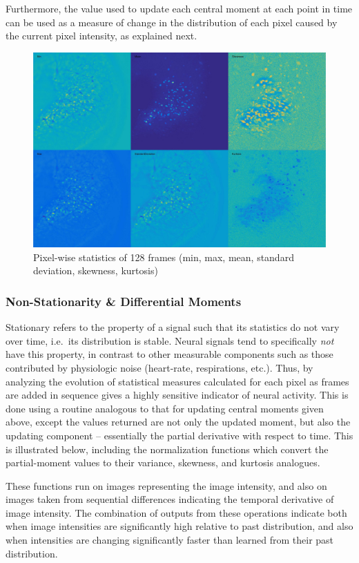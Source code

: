 Furthermore, the value used to update each central moment at each point in time can be used as a measure of change in the distribution of each pixel caused by the current pixel intensity, as explained next.

\begin{figure}[htb]\centering
	\includegraphics[width=12cm]{figures/statistics_of_128_frames_contrast_enhanced.jpg}
	\caption{Pixel-wise statistics of 128 frames (min, max, mean, standard deviation, skewness, kurtosis)}
\end{figure}

\subsubsection{Non-Stationarity \& Differential Moments}\label{sec:non-stationarity-differential-moments}

Stationary refers to the property of a signal such that its statistics do not vary over time, i.e.~its distribution is stable.
Neural signals tend to specifically \emph{not} have this property, in contrast to other measurable components such as those contributed by physiologic noise (heart-rate, respirations, etc.).
Thus, by analyzing the evolution of statistical measures calculated for each pixel as frames are added in sequence gives a highly sensitive indicator of neural activity.
This is done using a routine analogous to that for updating central moments given above, except the values returned are not only the updated moment, but also the updating component -- essentially the partial derivative with respect to time.
This is illustrated below, including the normalization functions which convert the partial-moment values to their variance, skewness, and kurtosis analogues.


These functions run on images representing the image intensity, and also on images taken from sequential differences indicating the temporal derivative of image intensity.
The combination of outputs from these operations indicate both when image intensities are significantly high relative to past distribution, and also when intensities are changing significantly faster than learned from their past distribution.


